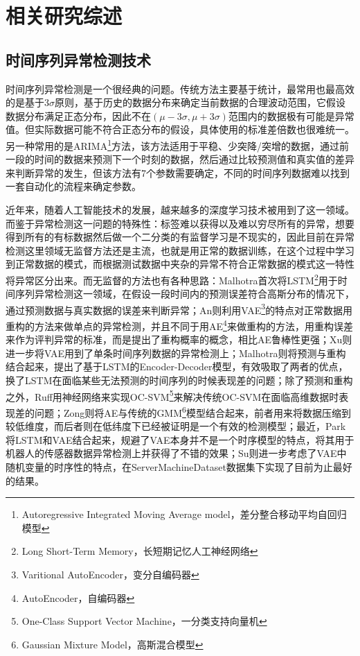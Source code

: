 
\chapter{相关研究综述}
\label{cha:intro}
\section{时间序列异常检测技术}
时间序列异常检测是一个很经典的问题。传统方法主要基于统计，最常用也最高效的是基于3$\sigma$原则，基于历史的数据分布来确定当前数据的合理波动范围，它假设数据分布满足正态分布，因此不在$(\mu - 3\sigma,\mu + 3\sigma)$范围内的数据极有可能是异常值。但实际数据可能不符合正态分布的假设，具体使用的标准差倍数也很难统一。另一种常用的是ARIMA\footnote{Autoregressive Integrated Moving Average model，差分整合移动平均自回归模型}方法，该方法适用于平稳、少突降/突增的数据，通过前一段的时间的数据来预测下一个时刻的数据，然后通过比较预测值和真实值的差异来判断异常的发生，但该方法有7个参数需要确定，不同的时间序列数据难以找到一套自动化的流程来确定参数。

近年来，随着人工智能技术的发展，越来越多的深度学习技术被用到了这一领域。而鉴于异常检测这一问题的特殊性：标签难以获得以及难以穷尽所有的异常，想要得到所有的有标数据然后做一个二分类的有监督学习是不现实的，因此目前在异常检测这里领域无监督方法还是主流，也就是用正常的数据训练，在这个过程中学习到正常数据的模式，而根据测试数据中夹杂的异常不符合正常数据的模式这一特性将异常区分出来。而无监督的方法也有各种思路：Malhotra\cite{malhotra2015long}首次将LSTM\footnote{Long Short-Term Memory，长短期记忆人工神经网络}用于时间序列异常检测这一领域，在假设一段时间内的预测误差符合高斯分布的情况下，通过预测数据与真实数据的误差来判断异常；An\cite{an2015variational}则利用VAE\footnote{Varitional AutoEncoder，变分自编码器}的特点对正常数据用重构的方法来做单点的异常检测，并且不同于用AE\footnote{AutoEncoder，自编码器}来做重构的方法，用重构误差来作为评判异常的标准，而是提出了重构概率的概念，相比AE鲁棒性更强；Xu\cite{xu2018unsupervised}则进一步将VAE用到了单条时间序列数据的异常检测上；Malhotra\cite{malhotra2016lstm}则将预测与重构结合起来，提出了基于LSTM的Encoder-Decoder模型，有效吸取了两者的优点，换了LSTM在面临某些无法预测的时间序列的时候表现差的问题；除了预测和重构之外，Ruff\cite{ruff2018deep}用神经网络来实现OC-SVM\footnote{One-Class Support Vector Machine，一分类支持向量机}来解决传统OC-SVM在面临高维数据时表现差的问题；Zong\cite{zong2018deep}则将AE与传统的GMM\footnote{Gaussian Mixture Model，高斯混合模型}模型结合起来，前者用来将数据压缩到较低维度，而后者则在低纬度下已经被证明是一个有效的检测模型；最近，Park\cite{park2018multimodal}将LSTM和VAE结合起来，规避了VAE本身并不是一个时序模型的特点，将其用于机器人的传感器数据异常检测上并获得了不错的效果；Su\cite{su2019robust}则进一步考虑了VAE中随机变量的时序性的特点，在ServerMachineDataset数据集下实现了目前为止最好的结果。

